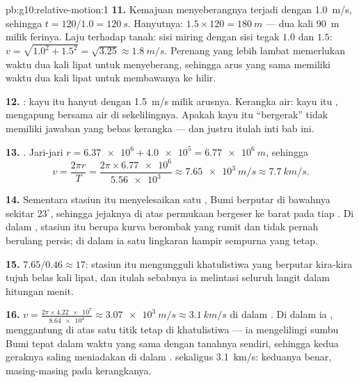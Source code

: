 \begin{solution}{pb:g10:relative-motion:1}
\textbf{11.} Kemajuan menyeberangnya terjadi dengan \qty{1.0}{m/s},
sehingga $t = 120/1.0 = \qty{120}{s}$. Hanyutnya:
$1.5 \times 120 = \qty{180}{m}$ --- dua kali \qty{90}{m} milik ferinya.
Laju terhadap tanah: sisi miring dengan sisi tegak $1.0$ dan $1.5$:
$v = \sqrt{1.0^2 + 1.5^2} = \sqrt{3.25}
\approx \qty{1.8}{m/s}$.
Perenang yang lebih lambat memerlukan waktu dua kali lipat untuk
menyeberang, sehingga arus yang sama memiliki waktu dua kali lipat
untuk membawanya ke hilir.

\textbf{12.} : kayu itu hanyut dengan \qty{1.5}{m/s}
milik arusnya. Kerangka air: kayu itu , mengapung bersama air di
sekelilingnya. Apakah kayu itu ``bergerak'' tidak memiliki jawaban yang
bebas kerangka --- dan justru itulah inti bab ini.

\textbf{13.} . Jari-jari 
$r = \num{6.37e6} + \num{4.0e5} = \qty{6.77e6}{m}$, sehingga
\[
v = \frac{2\pi r}{T} = \frac{2\pi \times \num{6.77e6}}{\num{5.56e3}}
\approx \qty{7.65e3}{m/s} \approx \qty{7.7}{km/s}.
\]

\textbf{14.} Sementara stasiun itu menyelesaikan satu , Bumi
berputar di bawahnya sekitar $23^\circ$, sehingga jejaknya di atas
permukaan bergeser ke barat pada tiap . Di dalam ,  stasiun itu berupa kurva berombak yang rumit dan tidak
pernah berulang persis; di dalam  ia satu lingkaran
hampir sempurna yang tetap.

\textbf{15.} $7.65 / 0.46 \approx 17$: stasiun itu mengungguli
khatulistiwa yang berputar kira-kira tujuh belas kali lipat, dan itulah
sebabnya ia melintasi seluruh langit dalam hitungan menit.

\textbf{16.} $v = \frac{2\pi \times \num{4.22e7}}{\num{8.64e4}}
\approx \qty{3.07e3}{m/s} \approx \qty{3.1}{km/s}$ di dalam . Di dalam  ia \emph{}, menggantung di atas
satu titik tetap di khatulistiwa --- ia mengelilingi sumbu Bumi tepat
dalam waktu yang sama dengan tanahnya sendiri, sehingga kedua geraknya
saling meniadakan di dalam .  sekaligus
\qty{3.1}{km/s}: keduanya benar, masing-masing pada kerangkanya.


\end{solution}
